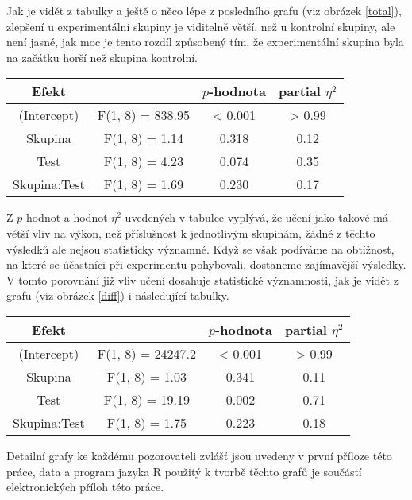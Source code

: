 
Jak je vidět z tabulky a ještě o něco lépe z posledního grafu (viz obrázek \ref{total}), zlepšení u experimentální skupiny je viditelně větší, než u kontrolní skupiny, ale není jasné, jak moc je tento rozdíl způsobený tím, že experimentální skupina byla na začátku horší než skupina kontrolní. 

\begin{center}
\begin{tabular}{cccc}
\hline\hline
       Efekt & &$p$-hodnota & partial $\eta^2$ \\
\hline                                            
 (Intercept)& F(1, 8) = 838.95& < 0.001 & > 0.99 \\
       Skupina&F(1, 8) =   1.14& 0.318 & 0.12 \\ 
       Test &F(1, 8) =   4.23& 0.074 & 0.35 \\ 
 Skupina:Test&F(1, 8) =   1.69& 0.230 & 0.17 \\ 
\hline\hline

\end{tabular}
\end{center}

Z $p$-hodnot a hodnot $\eta^2$ uvedených v tabulce vyplývá, že učení jako takové má větší vliv na výkon, než příslušnost k jednotlivým skupinám, žádné z těchto výsledků ale nejsou statisticky významné. Když se však podíváme na obtížnost, na které se účastníci při experimentu pohybovali, dostaneme zajímavější výsledky. V tomto porovnání již vliv učení dosahuje statistické významnosti, jak je vidět z grafu (viz obrázek \ref{diff}) i následující tabulky.

\begin{center}
\begin{tabular}{cccc}
\hline\hline
       Efekt & &$p$-hodnota & partial $\eta^2$ \\
\hline                                         
(Intercept)& F(1, 8) = 24247.2&  < 0.001& > 0.99\\
       Skupina& F(1, 8) =     1.03& 0.341&   0.11    \\
      Test& F(1, 8) =    19.19& 0.002&  0.71  \\
 Skupina:Test& F(1, 8) =     1.75& 0.223&  0.18       \\

\hline\hline

\end{tabular}
\end{center}




Detailní grafy ke každému pozorovateli zvlášť jsou uvedeny v první příloze této práce,
data a program jazyka R použitý k tvorbě těchto grafů je součástí
elektronických příloh této práce.

